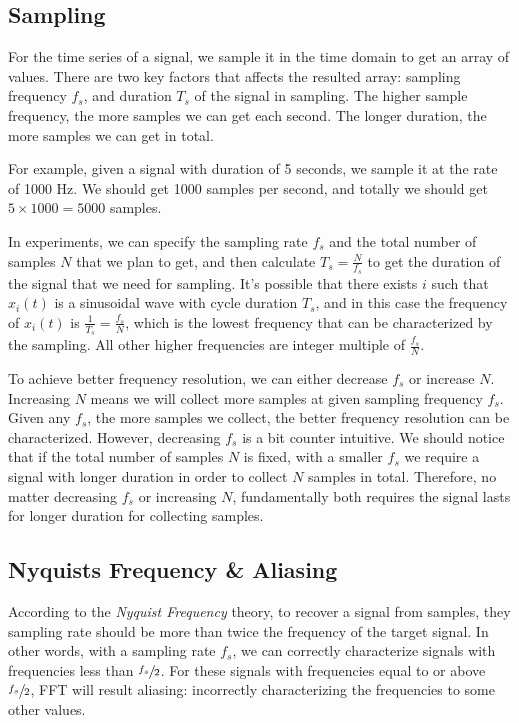\documentclass[11pt, oneside]{article}   	%
\begin{document}
\subsection{Sampling}
For the time series of a signal, we sample it in the time domain to get an array of values. There are two key factors that affects the resulted array: sampling frequency $f_s$, and duration $T_s$ of the signal in sampling. The higher sample frequency, the more samples we can get each second. The longer duration, the more samples we can get in total.

For example, given a signal with duration of 5 seconds, we sample it at the rate of 1000 Hz. We should get 1000 samples per second, and totally we should get $5\times 1000 = 5000$ samples.

In experiments, we can specify the sampling rate $f_s$ and the total number of samples $N$ that we plan to get, and then calculate $T_s = \frac{N}{f_s}$ to get the duration of the signal that we need for sampling. It's possible that there exists $i$ such that $x_i(t)$ is a sinusoidal wave with cycle duration $T_s$, and in this case the frequency of $x_i(t)$ is $\frac{1}{T_s} = \frac{f_s}{N}$, which is the lowest frequency that can be characterized by the sampling. All other higher frequencies are integer multiple of $\frac{f_s}{N}.$

To achieve better frequency resolution, we can either decrease $f_s$ or increase $N$. Increasing $N$ means we will collect more samples at given sampling frequency $f_s$. Given any $f_s$, the more samples we collect, the better frequency resolution can be characterized. However, decreasing $f_s$ is a bit counter intuitive. We should notice that if the total number of samples $N$ is fixed, with a smaller $f_s$ we require a signal with longer duration in order to collect $N$ samples in total. Therefore, no matter decreasing $f_s$ or  increasing $N$, fundamentally both requires the signal lasts for longer duration for collecting samples.

\subsection{Nyquists Frequency \& Aliasing}
According to the \emph{Nyquist Frequency} theory, to recover a signal from samples, they sampling rate should be more than twice the frequency of the target signal. In other words, with a sampling rate $f_s$, we can correctly characterize signals with frequencies less than $\sfrac{f_s}{2}$. For these signals with frequencies equal to or above $\sfrac{f_s}{2}$, FFT will result aliasing: incorrectly characterizing the frequencies to some other values.
\end{document}
